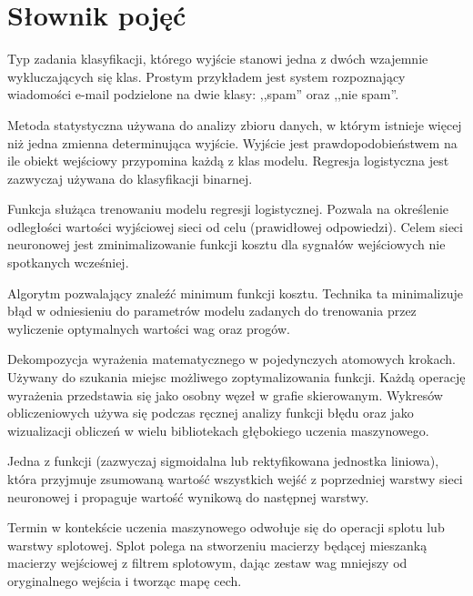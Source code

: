\documentclass[12pt,a4paper,twoside,titlepage,openright]{book}
\begin{document}
\chapter*{Słownik pojęć}
\begin{description}[style=nextline]
	\item[Klasyfikacja binarna] Typ zadania klasyfikacji, którego wyjście stanowi jedna z dwóch wzajemnie wykluczających się klas. Prostym przykładem jest system rozpoznający wiadomości e-mail podzielone na dwie klasy: ,,spam'' oraz ,,nie spam''.
	\item[Regresja logistyczna] Metoda statystyczna używana do analizy zbioru danych, w którym istnieje więcej niż jedna zmienna determinująca wyjście. Wyjście jest prawdopodobieństwem na ile obiekt wejściowy przypomina każdą z klas modelu. Regresja logistyczna jest zazwyczaj używana do klasyfikacji binarnej.
	\item[Funkcja kosztu] Funkcja służąca trenowaniu modelu regresji logistycznej. Pozwala na określenie odległości wartości wyjściowej sieci od celu (prawidłowej odpowiedzi). Celem sieci neuronowej jest zminimalizowanie funkcji kosztu dla sygnałów wejściowych nie spotkanych wcześniej.
	\item[Metoda gradientu prostego (ang. \textit{gradient descent algorithm})] Algorytm pozwalający znaleźć minimum funkcji kosztu. Technika ta minimalizuje błąd w odniesieniu do parametrów modelu zadanych do trenowania przez wyliczenie optymalnych wartości wag oraz progów.
	\item[Wykres obliczeniowy (ang. \textit{computation graph})] Dekompozycja wyrażenia matematycznego w pojedynczych atomowych krokach. Używany do szukania miejsc możliwego zoptymalizowania funkcji. Każdą operację wyrażenia przedstawia się jako osobny węzeł w grafie skierowanym. Wykresów obliczeniowych używa się podczas ręcznej analizy funkcji błędu oraz jako wizualizacji obliczeń w wielu bibliotekach głębokiego uczenia maszynowego.
	\item[Funkcja aktywacji] Jedna z funkcji (zazwyczaj sigmoidalna lub rektyfikowana jednostka liniowa), która przyjmuje zsumowaną wartość wszystkich wejść z poprzedniej warstwy sieci neuronowej i propaguje wartość wynikową do następnej warstwy.
	\item[Konwolucja (ang. \textit{convolution})] Termin w kontekście uczenia maszynowego odwołuje się do operacji splotu lub warstwy splotowej. Splot polega na stworzeniu macierzy będącej mieszanką macierzy wejściowej z filtrem splotowym, dając zestaw wag mniejszy od oryginalnego wejścia i tworząc mapę cech.

\end{description}
\end{document}
